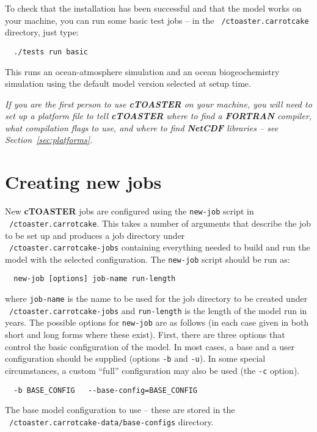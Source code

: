 \documentclass[a4paper,10pt,article]{memoir}
\begin{document}
To check that the installation has been successful and that the model works on your machine, you can run some basic test jobs -- in the \texttt{~/ctoaster.carrotcake} directory, just type:
\begin{verbatim}
  ./tests run basic
\end{verbatim}
This runs an ocean-atmosphere simulation and an ocean biogeochemistry simulation using the default model version selected at setup time.

\emph{If you are the first person to use \textbf{cTOASTER} on your machine, you
  will need to set up a platform file to tell \textbf{cTOASTER} where to find a
  \textbf{FORTRAN} compiler, what compilation flags to use, and where to find
  \textbf{NetCDF} libraries -- see Section~\ref{sec:platforms}.}

\section{Creating new jobs}

New \textbf{cTOASTER} jobs are configured using the \texttt{new-job} script in
\texttt{~/ctoaster.carrotcake}. This takes a number of arguments that describe the
job to be set up and produces a job directory under
\\\texttt{~/ctoaster.carrotcake-jobs} containing everything needed to build and run
the model with the selected configuration.  The \texttt{new-job}
script should be run as:
\begin{verbatim}
  new-job [options] job-name run-length
\end{verbatim}
where \texttt{job-name} is the name to be used for the job directory
to be created under \texttt{~/ctoaster.carrotcake-jobs} and \texttt{run-length} is
the length of the model run in years.  The possible options for
\texttt{new-job} are as follows (in each case given in both short and
long forms where these exist).  First, there are three options that
control the basic configuration of the model.  In most cases, a base
and a user configuration should be supplied (options \texttt{-b} and
\texttt{-u}).  In some special circumstances, a custom ``full''
configuration may also be used (the \texttt{-c} option).

\begin{verbatim}
  -b BASE_CONFIG   --base-config=BASE_CONFIG
\end{verbatim}
The base model configuration to use -- these are stored in the
\texttt{~/ctoaster.carrotcake-data/base-configs} directory.
\end{document}

